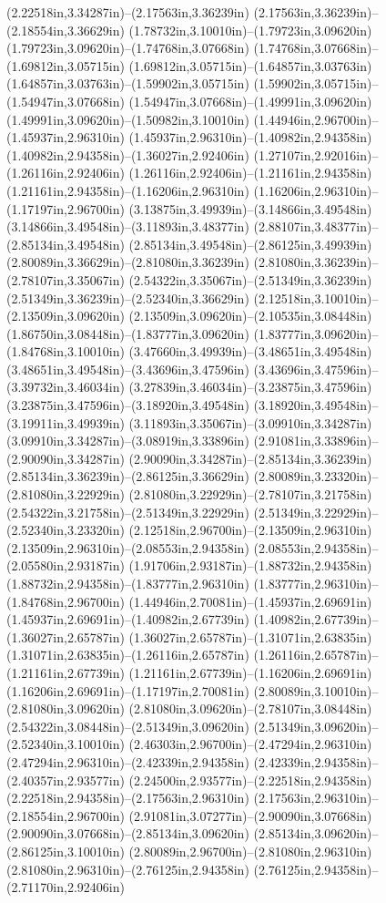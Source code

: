 (2.22518in,3.34287in)--(2.17563in,3.36239in) (2.17563in,3.36239in)--(2.18554in,3.36629in) (1.78732in,3.10010in)--(1.79723in,3.09620in) (1.79723in,3.09620in)--(1.74768in,3.07668in) (1.74768in,3.07668in)--(1.69812in,3.05715in) (1.69812in,3.05715in)--(1.64857in,3.03763in) (1.64857in,3.03763in)--(1.59902in,3.05715in) (1.59902in,3.05715in)--(1.54947in,3.07668in) (1.54947in,3.07668in)--(1.49991in,3.09620in) (1.49991in,3.09620in)--(1.50982in,3.10010in) (1.44946in,2.96700in)--(1.45937in,2.96310in) (1.45937in,2.96310in)--(1.40982in,2.94358in) (1.40982in,2.94358in)--(1.36027in,2.92406in) (1.27107in,2.92016in)--(1.26116in,2.92406in) (1.26116in,2.92406in)--(1.21161in,2.94358in) (1.21161in,2.94358in)--(1.16206in,2.96310in) (1.16206in,2.96310in)--(1.17197in,2.96700in) (3.13875in,3.49939in)--(3.14866in,3.49548in) (3.14866in,3.49548in)--(3.11893in,3.48377in) (2.88107in,3.48377in)--(2.85134in,3.49548in) (2.85134in,3.49548in)--(2.86125in,3.49939in) (2.80089in,3.36629in)--(2.81080in,3.36239in) (2.81080in,3.36239in)--(2.78107in,3.35067in) (2.54322in,3.35067in)--(2.51349in,3.36239in) (2.51349in,3.36239in)--(2.52340in,3.36629in) (2.12518in,3.10010in)--(2.13509in,3.09620in) (2.13509in,3.09620in)--(2.10535in,3.08448in) (1.86750in,3.08448in)--(1.83777in,3.09620in) (1.83777in,3.09620in)--(1.84768in,3.10010in) (3.47660in,3.49939in)--(3.48651in,3.49548in) (3.48651in,3.49548in)--(3.43696in,3.47596in) (3.43696in,3.47596in)--(3.39732in,3.46034in) (3.27839in,3.46034in)--(3.23875in,3.47596in) (3.23875in,3.47596in)--(3.18920in,3.49548in) (3.18920in,3.49548in)--(3.19911in,3.49939in) (3.11893in,3.35067in)--(3.09910in,3.34287in) (3.09910in,3.34287in)--(3.08919in,3.33896in) (2.91081in,3.33896in)--(2.90090in,3.34287in) (2.90090in,3.34287in)--(2.85134in,3.36239in) (2.85134in,3.36239in)--(2.86125in,3.36629in) (2.80089in,3.23320in)--(2.81080in,3.22929in) (2.81080in,3.22929in)--(2.78107in,3.21758in) (2.54322in,3.21758in)--(2.51349in,3.22929in) (2.51349in,3.22929in)--(2.52340in,3.23320in) (2.12518in,2.96700in)--(2.13509in,2.96310in) (2.13509in,2.96310in)--(2.08553in,2.94358in) (2.08553in,2.94358in)--(2.05580in,2.93187in) (1.91706in,2.93187in)--(1.88732in,2.94358in) (1.88732in,2.94358in)--(1.83777in,2.96310in) (1.83777in,2.96310in)--(1.84768in,2.96700in) (1.44946in,2.70081in)--(1.45937in,2.69691in) (1.45937in,2.69691in)--(1.40982in,2.67739in) (1.40982in,2.67739in)--(1.36027in,2.65787in) (1.36027in,2.65787in)--(1.31071in,2.63835in) (1.31071in,2.63835in)--(1.26116in,2.65787in) (1.26116in,2.65787in)--(1.21161in,2.67739in) (1.21161in,2.67739in)--(1.16206in,2.69691in) (1.16206in,2.69691in)--(1.17197in,2.70081in) (2.80089in,3.10010in)--(2.81080in,3.09620in) (2.81080in,3.09620in)--(2.78107in,3.08448in) (2.54322in,3.08448in)--(2.51349in,3.09620in) (2.51349in,3.09620in)--(2.52340in,3.10010in) (2.46303in,2.96700in)--(2.47294in,2.96310in) (2.47294in,2.96310in)--(2.42339in,2.94358in) (2.42339in,2.94358in)--(2.40357in,2.93577in) (2.24500in,2.93577in)--(2.22518in,2.94358in) (2.22518in,2.94358in)--(2.17563in,2.96310in) (2.17563in,2.96310in)--(2.18554in,2.96700in) (2.91081in,3.07277in)--(2.90090in,3.07668in) (2.90090in,3.07668in)--(2.85134in,3.09620in) (2.85134in,3.09620in)--(2.86125in,3.10010in) (2.80089in,2.96700in)--(2.81080in,2.96310in) (2.81080in,2.96310in)--(2.76125in,2.94358in) (2.76125in,2.94358in)--(2.71170in,2.92406in) 